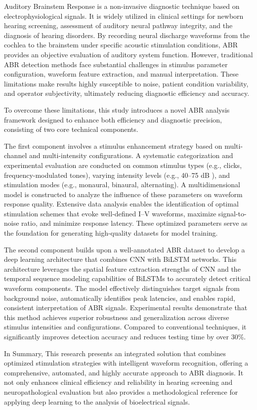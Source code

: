 \documentclass[type=master]{fduthesis}
\begin{document}
\begin{abstract*}
    Auditory Brainstem Response is a non-invasive diagnostic technique based on electrophysiological signals. It is widely utilized in clinical settings for newborn hearing screening, assessment of auditory neural pathway integrity, and the diagnosis of hearing disorders. By recording neural discharge waveforms from the cochlea to the brainstem under specific acoustic stimulation conditions, ABR provides an objective evaluation of auditory system function. However, traditional ABR detection methods face substantial challenges in stimulus parameter configuration, waveform feature extraction, and manual interpretation. These limitations make results highly susceptible to noise, patient condition variability, and operator subjectivity, ultimately reducing diagnostic efficiency and accuracy.

  To overcome these limitations, this study introduces a novel ABR analysis framework designed to enhance both efficiency and diagnostic precision, consisting of two core technical components.

  
  The first component involves a stimulus enhancement strategy based on multi-channel and multi-intensity configurations. A systematic categorization and experimental evaluation are conducted on common stimulus types (e.g., clicks, frequency-modulated tones), varying intensity levels (e.g., 40–75 dB ), and stimulation modes (e.g., monaural, binaural, alternating). A multidimensional model is constructed to analyze the influence of these parameters on waveform response quality. Extensive data analysis enables the identification of optimal stimulation schemes that evoke well-defined I–V waveforms, maximize signal-to-noise ratio, and minimize response latency. These optimized parameters serve as the foundation for generating high-quality datasets for model training.

  The second component builds upon a well-annotated ABR dataset to develop a deep learning architecture that combines CNN with BiLSTM networks. This architecture leverages the spatial feature extraction strengths of CNN and the temporal sequence modeling capabilities of BiLSTMs to accurately detect critical waveform components. The model effectively distinguishes target signals from background noise, automatically identifies peak latencies, and enables rapid, consistent interpretation of ABR signals. Experimental results demonstrate that this method achieves superior robustness and generalization across diverse stimulus intensities and configurations. Compared to conventional techniques, it significantly improves detection accuracy and reduces testing time by over 30\%.

  
  In Summary, This research presents an integrated solution that combines optimized stimulation strategies with intelligent waveform recognition, offering a comprehensive, automated, and highly accurate approach to ABR diagnosis. It not only enhances clinical efficiency and reliability in hearing screening and neuropathological evaluation but also provides a methodological reference for applying deep learning to the analysis of bioelectrical signals.

\end{abstract*}
\end{document}

